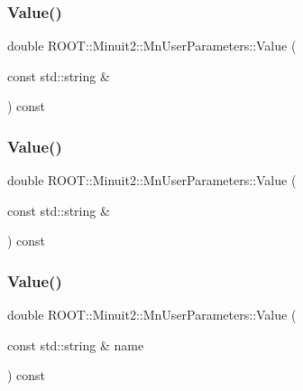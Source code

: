 \subsubsection{\texorpdfstring{Value()}{Value()}\hspace{0.1cm}{\footnotesize\ttfamily [4/6]}}
{\footnotesize\ttfamily double R\+O\+O\+T\+::\+Minuit2\+::\+Mn\+User\+Parameters\+::\+Value (\begin{DoxyParamCaption}\item[{const std\+::string \&}]{ }\end{DoxyParamCaption}) const}

\mbox{\label{classROOT_1_1Minuit2_1_1MnUserParameters_a4d08de604380552a826ac23ca4978767}} 
\subsubsection{\texorpdfstring{Value()}{Value()}\hspace{0.1cm}{\footnotesize\ttfamily [5/6]}}
{\footnotesize\ttfamily double R\+O\+O\+T\+::\+Minuit2\+::\+Mn\+User\+Parameters\+::\+Value (\begin{DoxyParamCaption}\item[{const std\+::string \&}]{ }\end{DoxyParamCaption}) const}

\mbox{\label{classROOT_1_1Minuit2_1_1MnUserParameters_a4d08de604380552a826ac23ca4978767}} 
\subsubsection{\texorpdfstring{Value()}{Value()}\hspace{0.1cm}{\footnotesize\ttfamily [6/6]}}
{\footnotesize\ttfamily double R\+O\+O\+T\+::\+Minuit2\+::\+Mn\+User\+Parameters\+::\+Value (\begin{DoxyParamCaption}\item[{const std\+::string \&}]{name }\end{DoxyParamCaption}) const}

